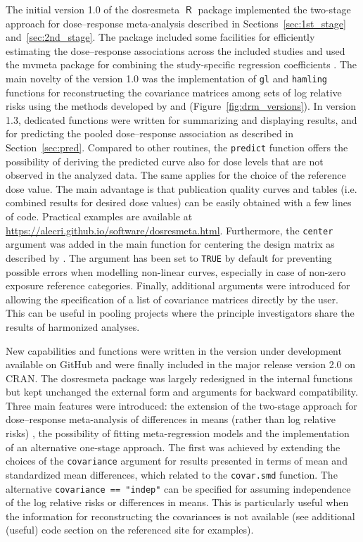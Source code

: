 \documentclass[11pt,a4paper,twoside,openany]{book}\usepackage{knitr}
\newcommand{\pkg}[1]{{\fontseries{b}\selectfont #1}}
\DeclareMathOperator{\R}{\textsf{R}}
\begin{document}
{{The initial version 1.0 of the \pkg{dosresmeta} $\R$ package implemented the two-stage approach for dose--response meta-analysis described in Sections~\ref{sec:1st_stage} and~\ref{sec:2nd_stage}. The package included some facilities for efficiently estimating the dose--response associations across the included studies and used the \pkg{mvmeta} package for combining the study-specific regression coefficients \citep{gasparrini2012multivariate}. The main novelty of the version 1.0 was the implementation of \texttt{gl} and \texttt{hamling} functions for reconstructing the covariance matrices among sets of log relative risks using the methods developed by \cite{greenland1992methods} and \cite{hamling2008facilitating} (Figure~\ref{fig:drm_versions}). 
In version 1.3, dedicated functions were written for summarizing and displaying results, and for predicting the pooled dose--response association as described in Section~\ref{sec:pred}. Compared to other routines, the \texttt{predict} function offers the possibility of deriving the predicted curve also for dose levels that are not observed in the analyzed data. The same applies for the choice of the reference dose value. The main advantage is that publication quality curves and tables (i.e. combined results for desired dose values) can be easily obtained with a few lines of code. Practical examples are available at \url{https://alecri.github.io/software/dosresmeta.html}.
Furthermore, the \texttt{center} argument was added in the main function for centering the design matrix as described by \cite{liu2009two}. The argument has been set to \texttt{TRUE} by default for preventing possible errors when modelling non-linear curves, especially in case of non-zero exposure reference categories. Finally, additional arguments were introduced for allowing the specification of a list of covariance matrices directly by the user. This can be useful in pooling projects where the principle investigators share the results of harmonized analyses.

New capabilities and functions were written in the version under development available on GitHub and were finally included in the major release version 2.0 on CRAN. The \pkg{dosresmeta} package was largely redesigned in the internal functions but kept unchanged the external form and arguments for backward compatibility. Three main features were introduced: the extension of the two-stage approach for dose--response meta-analysis of differences in means (rather than log relative risks) \citep{crippa2016dose}, the  possibility of fitting meta-regression models and the implementation of an alternative one-stage approach. The first was achieved by extending the choices of the \texttt{covariance} argument for results presented in terms of mean and standardized mean differences, which related to the \texttt{covar.smd} function. The alternative \texttt{covariance == "indep"} can be specified for assuming independence of the log relative risks or differences in means. This is particularly useful when the information for reconstructing the covariances is not available (see additional (useful) code section on the referenced site for examples).

}}
\end{document}
